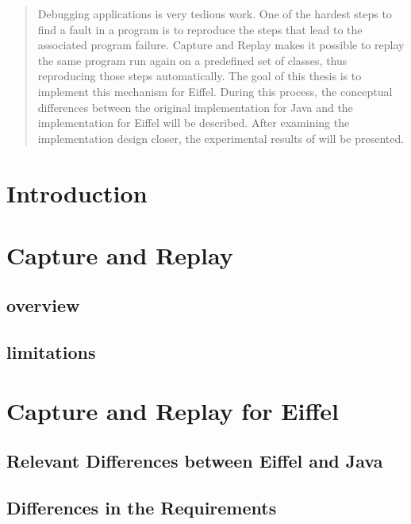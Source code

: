 \documentclass[a4paper,10pt]{article}
\begin{document}
\newpage
\begin{abstract}
Debugging applications is very tedious work. One of the hardest steps to find a fault in a program is to reproduce the steps that lead to the associated program failure. Capture and Replay \cite{orso05may} makes it possible to replay the same program run again on a predefined set of classes, thus reproducing those steps automatically. The goal of this thesis is to implement this mechanism for Eiffel. During this process, the conceptual differences between the original implementation for Java and the implementation for Eiffel will be described. After examining the implementation design closer, the experimental results of will be presented.

\end{abstract}

\newpage

\section{Introduction}

\section{Capture and Replay}
\subsection{overview}
\subsection{limitations}



\section{Capture and Replay for Eiffel}
\subsection{Relevant Differences between Eiffel and Java}
\subsection{Differences in the Requirements}
\end{document}
